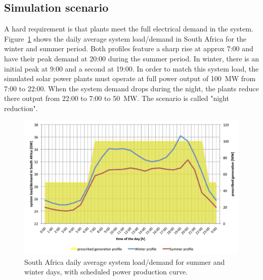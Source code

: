 \subsection{Simulation scenario} \label{Overall simulated configuration}
A hard requirement is that plants meet the full electrical demand in the system. Figure~\ref{LoadScenarios} shows the daily average system load/demand in South Africa for the winter and summer period.
Both profiles feature a sharp rise at approx 7:00 and have their peak demand at 20:00 during the summer period.
In winter, there is an initial peak at 9:00 and a second at 19:00.
In order to match this system load, the simulated solar power plants must operate at full power output of 100~MW from 7:00 to 22:00. When the system demand drops during the night, the plants reduce there output from 22:00 to 7:00 to 50~MW. The scenario is called "night reduction".
\begin{figure}[htbp]  
\centering
\includegraphics[width=1\linewidth]{FIG/LoadScenarios}
\caption[South Africa daily average system load/demand for summer and winter days, with scheduled power production curve.]{South Africa daily average system load/demand for summer and winter days, with scheduled power production curve.}\label{LoadScenarios}
\end{figure}
